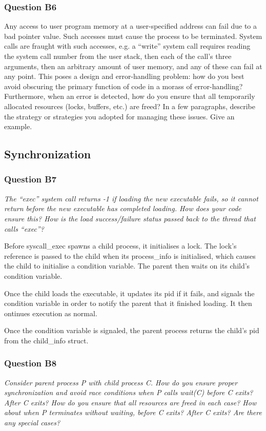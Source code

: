 \subsubsection*{Question B6} %
Any access to user program memory at a user-specified address can fail due to a bad pointer value.  Such accesses must cause the process to be terminated.  System calls are fraught with such accesses, e.g. a ``write'' system call requires reading the system call number from the user stack, then each of the call's three arguments, then an arbitrary amount of user memory, and any of these can fail at any point.  This poses a design and error-handling problem: how do you best avoid obscuring the primary function of code in a morass of error-handling?  Furthermore, when an error is detected, how do you ensure that all temporarily allocated resources (locks, buffers, etc.) are freed?  In a few paragraphs, describe the strategy or strategies you adopted for managing these issues.  Give an example.

\subsection{Synchronization}

\subsubsection*{Question B7} %
\textit{The ``exec'' system call returns -1 if loading the new executable fails, so it cannot return before the new executable has completed loading.  How does your code ensure this?  How is the load success/failure status passed back to the thread that calls ``exec''?}

Before syscall\_exec spawns a child process, it initialises a lock. The lock's reference is passed to the child when its process\_info is initialised, which causes the child to initialise a condition variable. The parent then waits on its child's condition variable.

Once the child loads the executable, it updates its pid if it fails, and signals the condition variable in order to notify the parent that it finished loading. It then ontinues execution as normal.

Once the condition variable is signaled, the parent process returns the child's pid from the child\_info struct.

\subsubsection*{Question B8} %
\textit{Consider parent process P with child process C.  How do you ensure proper synchronization and avoid race conditions when P calls wait(C) before C exits?  After C exits?  How do you ensure that all resources are freed in each case?  How about when P terminates without waiting, before C exits?  After C exits?  Are there any special cases?}



